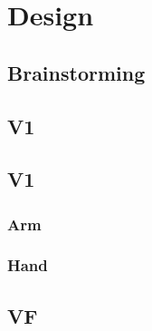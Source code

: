 \section{Design}
\subsection{Brainstorming}

\subsection{V1}

\subsection{V1}
\subsubsection{Arm}

\subsubsection{Hand}

\subsection{VF}
